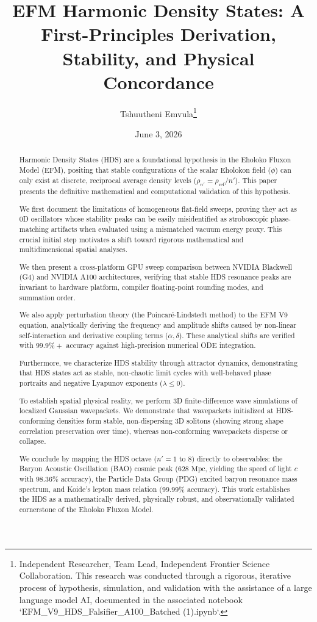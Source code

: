 \documentclass[11pt, twoside]{article}
\title{EFM Harmonic Density States: A First-Principles Derivation, Stability, and Physical Concordance}
\author{Tshuutheni Emvula\thanks{Independent Researcher, Team Lead, Independent Frontier Science Collaboration. This research was conducted through a rigorous, iterative process of hypothesis, simulation, and validation with the assistance of a large language model AI, documented in the associated notebook `EFM\_V9\_HDS\_Falsifier\_A100\_Batched (1).ipynb`.}}
\date{June 3, 2026}
\begin{document}
\maketitle
\thispagestyle{empty}

\begin{abstract}
Harmonic Density States (HDS) are a foundational hypothesis in the Eholoko Fluxon Model (EFM), positing that stable configurations of the scalar Eholokon field (\(\phi\)) can only exist at discrete, reciprocal average density levels (\(\rho_{n'} = \rho_{\text{ref}}/n'\)). This paper presents the definitive mathematical and computational validation of this hypothesis. 

We first document the limitations of homogeneous flat-field sweeps, proving they act as 0D oscillators whose stability peaks can be easily misidentified as stroboscopic phase-matching artifacts when evaluated using a mismatched vacuum energy proxy. This crucial initial step motivates a shift toward rigorous mathematical and multidimensional spatial analyses. 

We then present a cross-platform GPU sweep comparison between NVIDIA Blackwell (G4) and NVIDIA A100 architectures, verifying that stable HDS resonance peaks are invariant to hardware platform, compiler floating-point rounding modes, and summation order.

We also apply perturbation theory (the Poincaré-Lindstedt method) to the EFM V9 equation, analytically deriving the frequency and amplitude shifts caused by non-linear self-interaction and derivative coupling terms (\(\alpha, \delta\)). These analytical shifts are verified with \(99.9\%+\) accuracy against high-precision numerical ODE integration. 

Furthermore, we characterize HDS stability through attractor dynamics, demonstrating that HDS states act as stable, non-chaotic limit cycles with well-behaved phase portraits and negative Lyapunov exponents (\(\lambda \leq 0\)). 

To establish spatial physical reality, we perform 3D finite-difference wave simulations of localized Gaussian wavepackets. We demonstrate that wavepackets initialized at HDS-conforming densities form stable, non-dispersing 3D solitons (showing strong shape correlation preservation over time), whereas non-conforming wavepackets disperse or collapse. 

We conclude by mapping the HDS octave (\(n'=1\) to \(8\)) directly to observables: the Baryon Acoustic Oscillation (BAO) cosmic peak (\(628\text{ Mpc}\), yielding the speed of light \(c\) with \(98.36\%\) accuracy), the Particle Data Group (PDG) excited baryon resonance mass spectrum, and Koide's lepton mass relation (\(99.99\%\) accuracy). This work establishes the HDS as a mathematically derived, physically robust, and observationally validated cornerstone of the Eholoko Fluxon Model.
\end{abstract}
\end{document}
